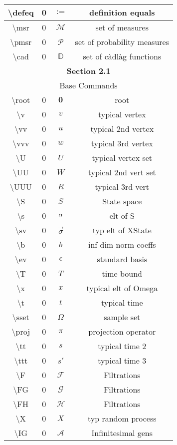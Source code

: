 \documentclass[12pt]{article}
\newcommand{\mb}{\mathbb}
\newcommand{\mc}{\mathcal}
\newcommand{\ep}{\epsilon}
\newcommand{\tbs}{\textbackslash}
\newcommand{\defeq}{:=}								%
\newcommand{\msr}{\mc{M}}							%
\newcommand{\pmsr}{\mc{P}}							%
\newcommand{\cad}{\mb{D}}							%
\renewcommand{\root}{\mathbf{0}}				%
\renewcommand{\v}{v}							%
\newcommand{\vv}{u}								%
\newcommand{\vvv}{w}							%
\renewcommand{\U}{U}							%
\newcommand{\UU}{W}								%
\newcommand{\UUU}{R}							%
\renewcommand{\S}{S}							%
\newcommand{\s}{\sigma}							%
\newcommand{\sv}{\vec{\s}}						%
\renewcommand{\b}{b}							%
\newcommand{\ev}{\ep}							%
\newcommand{\T}{T}								%
\newcommand{\x}{x}								%
\renewcommand{\t}{t}							%
\newcommand{\sset}{\Omega}						%
\newcommand{\proj}{\pi}							%
\renewcommand{\tt}{s}							%
\newcommand{\ttt}{s'}							%
\newcommand{\F}{\mc{F}}							%
\newcommand{\FG}{\mc{G}}						%
\newcommand{\FH}{\mc{H}}						%
\newcommand{\X}{X}								%
\newcommand{\IG}{\mc{A}}						%
\begin{document}
\begin{longtable}{|c|c|c|c|}
\tbs defeq & 0 & \(\defeq\) & definition equals\\\hline	
\tbs msr & 0 & \(\msr\) & set of measures\\\hline
\tbs pmsr & 0 & \(\pmsr\) & set of probability measures\\\hline	
\tbs cad & 0 & \(\cad\) & set of c\`adl\`ag functions\\\hline
\multicolumn{4}{|c|}{\textbf{Section 2.1}}\\\hline
\multicolumn{4}{|c|}{Base Commands}\\\hline
\tbs root & 0 & \(\root\) & root\\\hline
\tbs v & 0 & \(\v\) & typical vertex\\\hline
\tbs vv & 0 & \(\vv\) & typical 2nd vertex\\\hline
\tbs vvv & 0 & \(\vvv\) & typical 3rd vertex\\\hline
\tbs U & 0 & \(\U\) & typical vertex set\\\hline
\tbs UU & 0 & \(\UU\) & typical 2nd vert set\\\hline
\tbs UUU & 0 & \(\UUU\) & typical 3rd vert\\\hline
\tbs S & 0 & \(\S\) & State space\\\hline
\tbs s & 0 & \(\s\) & elt of S\\\hline
\tbs sv & 0 & \(\sv\) & typ elt of XState\\\hline
\tbs b & 0 & \(\b\) & inf dim norm coeffs\\\hline
\tbs ev & 0 & \(\ev\) & standard basis\\\hline
\tbs T & 0 & \(\T\) & time bound\\\hline
\tbs x & 0 & \(\x\) & typical elt of Omega\\\hline
\tbs t & 0 & \(\t\) & typical time\\\hline
\tbs sset & 0 & \(\sset\) & sample set\\\hline
\tbs proj & 0 & \(\proj\) & projection operator\\\hline
\tbs tt & 0 & \(\tt\) & typical time 2\\\hline
\tbs ttt & 0 & \(\ttt\) & typical time 3\\\hline
\tbs F & 0 & \(\F\) & Filtrations\\\hline
\tbs FG & 0 & \(\FG\) & Filtrations\\\hline
\tbs FH & 0 & \(\FH\) & Filtrations\\\hline
\tbs X & 0 & \(\X\) & typ random process\\\hline
\tbs IG & 0 & \(\IG\) & Infinitesimal gens\\\hline

\end{longtable}
\end{document}

